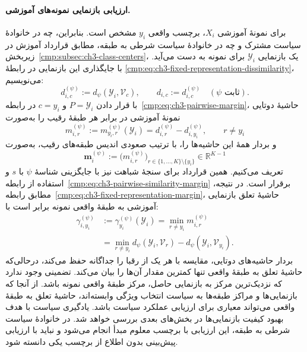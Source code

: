 \paragraph{ارزیابی بازنمایی نمونه‌های آموزشی.}
برای نمونهٔ آموزشی $X_i$، برچسب واقعی $y_i$ مشخص
است. بنابراین، چه در خانوادهٔ سیاست مشترک و چه در
خانوادهٔ سیاست شرطی به طبقه، مطابق قرارداد آموزش در
زیربخش~\ref{cmp:subsec:ch3-class-centers}، یک بازنمایی
$\mathscr Y_i$ برای نمونه به دست می‌آید.
با جایگذاری این بازنمایی در رابطهٔ
\eqref{cmp:eq:ch3-fixed-representation-dissimilarity}،
می‌نویسیم:
\begin{equation}\label{cmp:eq:ch3-general-center-dissimilarity}
d_{i,c}^{(\psi)}:=d_\psi(\mathscr Y_i,\mathcal V_c),
\qquad d_{i,c}:=d_{i,c}^{(\psi)}\quad(\psi\text{ ثابت}).
\end{equation}
با قرار دادن $P=\mathscr Y_i$ و $c=y_i$ در
رابطه~\eqref{cmp:eq:ch3-pairwise-margin}، حاشیهٔ دوتایی
نمونهٔ آموزشی در برابر هر طبقهٔ رقیب را به‌صورت
\begin{equation}\label{cmp:eq:ch3-training-pairwise-margin}
\boxed{
m_{i,r}^{(\psi)}
:=m_{y_i,r}^{(\psi)}(\mathscr Y_i)
=d_{i,r}^{(\psi)}-d_{i,y_i}^{(\psi)},
\qquad r\ne y_i
}
\end{equation}
و بردار همهٔ این حاشیه‌ها را، با ترتیب صعودی
اندیس طبقه‌های رقیب، به‌صورت
\begin{equation}\label{cmp:eq:ch3-training-pairwise-margin-vector}
\boldsymbol m_i^{(\psi)}
:=\bigl(m_{i,r}^{(\psi)}\bigr)_{r\in\{1,\ldots,K\}\setminus\{y_i\}}
\in\mathbb R^{K-1}
\end{equation}
تعریف می‌کنیم. همین قرارداد برای سنجهٔ شباهت نیز با
جایگزینی شناسهٔ $\psi$ با $s$ و استفاده از
رابطه~\eqref{cmp:eq:ch3-pairwise-similarity-margin}
برقرار است.
در نتیجه، مطابق رابطه~\eqref{cmp:eq:ch3-fixed-representation-margin}،
حاشیهٔ تعلق بازنمایی آموزشی به طبقهٔ واقعی نمونه برابر است با:
\begin{equation}\label{cmp:eq:ch3-training-true-class-margin}
\boxed{\begin{aligned}
\gamma_{i,y_i}^{(\psi)}
&:=\gamma_{y_i}^{(\psi)}(\mathscr Y_i)
=\min_{r\ne y_i}m_{i,r}^{(\psi)}\\
&=\min_{r\ne y_i}d_\psi(\mathscr Y_i,\mathcal V_r)
-d_\psi(\mathscr Y_i,\mathcal V_{y_i}).
\end{aligned}}
\end{equation}
بردار حاشیه‌های دوتایی، مقایسه با هر یک از رقبا
را جداگانه حفظ می‌کند، درحالی‌که حاشیهٔ تعلق به
طبقهٔ واقعی تنها کمترین مقدار آن‌ها را بیان می‌کند.
تضمینی وجود ندارد که نزدیک‌ترین مرکز به بازنمایی
حاصل، مرکز طبقهٔ واقعی نمونه باشد. از آنجا که
بازنمایی‌ها و مراکز طبقه‌ها به سیاست انتخاب ویژگی
وابسته‌اند، حاشیهٔ تعلق به طبقهٔ واقعی می‌تواند
معیاری برای ارزیابی عملکرد سیاست باشد. یادگیری سیاست
با هدف بهبود کیفیت بازنمایی‌ها در بخش‌های بعدی
بررسی خواهد شد. در خانوادهٔ سیاست شرطی به طبقه،
این ارزیابی با برچسب معلوم مبدأ انجام می‌شود و نباید
با ارزیابی پیش‌بینی بدون اطلاع از برچسب یکی دانسته شود.

